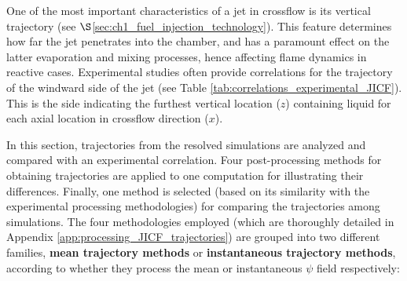 One of the most important characteristics of a jet in crossflow is its vertical trajectory (see $\S$\ref{sec:ch1_fuel_injection_technology}). This feature determines how far the jet penetrates into the chamber, and has a paramount effect on the latter evaporation and mixing processes, hence affecting flame dynamics in reactive cases. Experimental studies often provide correlations for the trajectory of the windward side of the jet (see Table \ref{tab:correlations_experimental_JICF}). This is the side indicating the furthest vertical location ($z$) containing liquid for each axial location in crossflow direction ($x$). %

In this section, trajectories from the resolved simulations are analyzed and compared with an experimental correlation. Four post-processing methods for obtaining trajectories are applied to one computation for illustrating their differences. Finally, one method is selected (based on its similarity with the experimental processing methodologies) for comparing the trajectories among simulations. The four methodologies employed (which are thoroughly detailed in Appendix \ref{app:processing_JICF_trajectories}) are grouped into two different families, \textbf{mean trajectory methods} or \textbf{instantaneous trajectory methods}, according to whether they process the mean or instantaneous $\psi$ field respectively:



